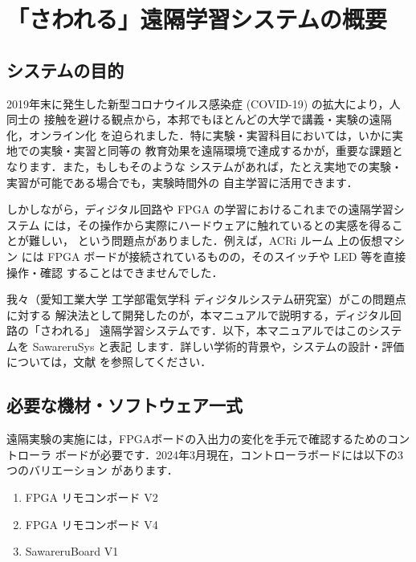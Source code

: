 \chapter{「さわれる」遠隔学習システムの概要}
\section{システムの目的}

2019年末に発生した新型コロナウイルス感染症 (COVID-19) の拡大により，人同士の
接触を避ける観点から，本邦でもほとんどの大学で講義・実験の遠隔化，オンライン化
を迫られました．特に実験・実習科目においては，いかに実地での実験・実習と同等の
教育効果を遠隔環境で達成するかが，重要な課題となります．また，もしもそのような
システムがあれば，たとえ実地での実験・実習が可能である場合でも，実験時間外の
自主学習に活用できます．

しかしながら，ディジタル回路や FPGA の学習におけるこれまでの遠隔学習システム
には，その操作から実際にハードウェアに触れているとの実感を得ることが難しい，
という問題点がありました．例えば，ACRi ルーム \cite{ACRi_Room}上の仮想マシン
には FPGA ボードが接続されているものの，そのスイッチや LED 等を直接操作・確認
することはできませんでした．

我々（愛知工業大学 工学部電気学科 ディジタルシステム研究室）がこの問題点に対する
解決法として開発したのが，本マニュアルで説明する，ディジタル回路の「さわれる」
遠隔学習システムです．以下，本マニュアルではこのシステムを SawareruSys と表記
します．詳しい学術的背景や，システムの設計・評価については，文献
\cite{TALE-fujieda} を参照してください．

\section{必要な機材・ソフトウェア一式}

遠隔実験の実施には，FPGAボードの入出力の変化を手元で確認するためのコントローラ
ボードが必要です．2024年3月現在，コントローラボードには以下の3つのバリエーション
があります．

\begin{enumerate}
 \item FPGA リモコンボード V2
 \item FPGA リモコンボード V4
 \item SawareruBoard V1
\end{enumerate}

